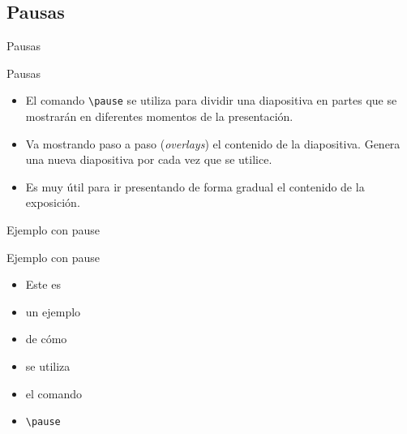 \documentclass[aspectratio=169, 10pt]{beamer}
\begin{document}
\subsection{Pausas}
\begin{frame}[fragile]{Pausas}
\begin{exampleblock}{Pausas} \pause
        \begin{itemize}
            \item El comando \verb|\pause| se utiliza para dividir una diapositiva en partes que se mostrarán en diferentes momentos de la presentación. \pause
            \item Va mostrando paso a paso (\textit{overlays}) el contenido de la diapositiva. Genera una nueva diapositiva por cada vez que se utilice. \pause
            \item Es muy útil para ir presentando de forma gradual el contenido de la exposición. \pause
        \end{itemize}

\end{exampleblock}

\end{frame}


\begin{frame}[fragile]{Ejemplo con pause}
    \begin{block}{Ejemplo con pause}
        \begin{itemize}
            \item Este es \pause
            \item un ejemplo \pause
            \item de cómo \pause
            \item se utiliza \pause
            \item el comando \pause
            \item \verb|\pause| 
        \end{itemize}
        
    \end{block}
    
\end{frame}
\end{document}
